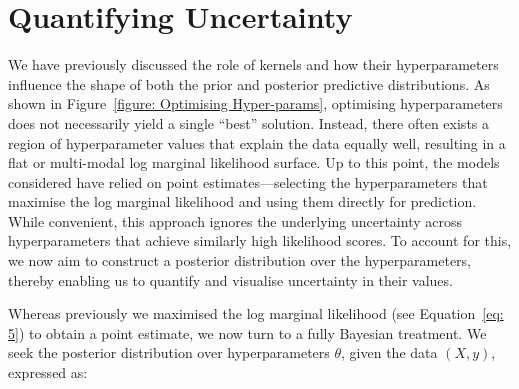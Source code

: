 \documentclass[10pt]{article}
\begin{document}
\section{Quantifying Uncertainty}
\label{sec: MCMC}
We have previously discussed the role of kernels and how their hyperparameters influence the shape of both the prior and posterior predictive distributions. As shown in Figure~\ref{figure: Optimising Hyper-params}, optimising hyperparameters does not necessarily yield a single “best” solution. 
Instead, there often exists a region of hyperparameter values that explain the data equally well, resulting in a flat or multi-modal log marginal likelihood surface.
Up to this point, the models considered have relied on point estimates—selecting the hyperparameters that maximise the log marginal likelihood and using them directly for prediction. 
While convenient, this approach ignores the underlying uncertainty across hyperparameters that achieve similarly high likelihood scores. To account for this, we now aim to construct a posterior distribution over the hyperparameters, thereby enabling us to quantify and visualise uncertainty in their values.

\noindent
Whereas previously we maximised the log marginal likelihood (see Equation~\ref{eq: 5}) to obtain a point estimate, we now turn to a fully Bayesian treatment. We seek the posterior distribution over hyperparameters \( \theta \), 
given the data \((X, y)\), expressed as:
\end{document}
